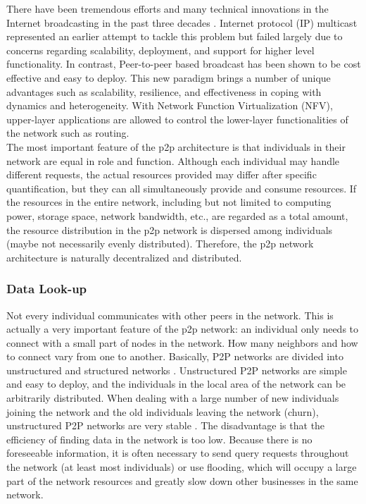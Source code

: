 There have been tremendous efforts and many technical innovations in the Internet broadcasting in the past three decades \cite{liu2008opportunities}. Internet protocol (IP) multicast represented an earlier attempt to tackle this problem but failed largely due to concerns regarding scalability, deployment, and support for higher level functionality. In contrast, Peer-to-peer based broadcast has been shown to be cost effective and easy to deploy. This new paradigm brings a number of unique advantages such as scalability, resilience, and effectiveness in coping with dynamics and heterogeneity. With Network Function Virtualization (NFV), upper-layer applications are allowed to control the lower-layer functionalities of the network such as routing.\\
The most important feature of the p2p architecture is that individuals in their network are equal in role and function. Although each individual may handle different requests, the actual resources provided may differ after specific quantification, but they can all simultaneously provide and consume resources. If the resources in the entire network, including but not limited to computing power, storage space, network bandwidth, etc., are regarded as a total amount, the resource distribution in the p2p network is dispersed among individuals (maybe not necessarily evenly distributed). Therefore, the p2p network architecture is naturally decentralized and distributed.

\subsubsection{Data Look-up}

Not every individual communicates with other peers in the network. This is actually a very important feature of the p2p network: an individual only needs to connect with a small part of nodes in the network. How many neighbors and how to connect vary from one to another. Basically, P2P networks are divided into unstructured and structured networks \cite{qiu2007towards}. Unstructured P2P networks are simple and easy to deploy, and the individuals in the local area of ​​the network can be arbitrarily distributed. When dealing with a large number of new individuals joining the network and the old individuals leaving the network (churn), unstructured P2P networks are very stable \cite{stutzbach2006understanding}. The disadvantage is that the efficiency of finding data in the network is too low. Because there is no foreseeable information, it is often necessary to send query requests throughout the network (at least most individuals) or use flooding, which will occupy a large part of the network resources and greatly slow down other businesses in the same network.

